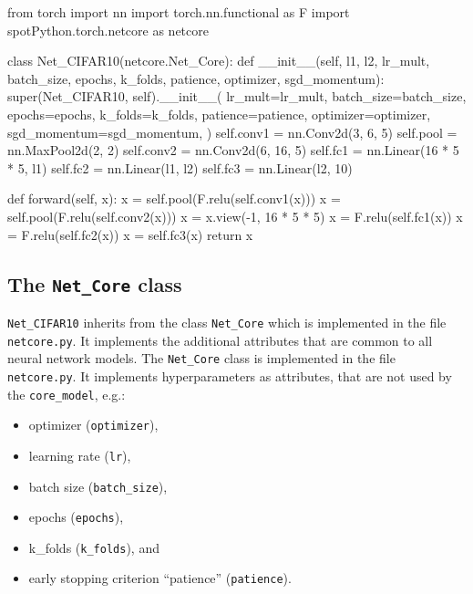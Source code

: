 \documentclass[
  letterpaper,
  DIV=11,
  numbers=noendperiod]{scrreprt}
\newenvironment{Shaded}{\begin{snugshade}}{\end{snugshade}}
\newcommand{\NormalTok}[1]{\textcolor[rgb]{0.00,0.23,0.31}{#1}}
\providecommand{\tightlist}{%
  \setlength{\itemsep}{0pt}\setlength{\parskip}{0pt}}\usepackage{longtable,booktabs,array}
\begin{document}
\begin{Shaded}
\begin{Highlighting}[]
\NormalTok{from torch import nn}
\NormalTok{import torch.nn.functional as F}
\NormalTok{import spotPython.torch.netcore as netcore}


\NormalTok{class Net\_CIFAR10(netcore.Net\_Core):}
\NormalTok{    def \_\_init\_\_(self, l1, l2, lr\_mult, batch\_size, epochs, k\_folds, patience,}
\NormalTok{    optimizer, sgd\_momentum):}
\NormalTok{        super(Net\_CIFAR10, self).\_\_init\_\_(}
\NormalTok{            lr\_mult=lr\_mult,}
\NormalTok{            batch\_size=batch\_size,}
\NormalTok{            epochs=epochs,}
\NormalTok{            k\_folds=k\_folds,}
\NormalTok{            patience=patience,}
\NormalTok{            optimizer=optimizer,}
\NormalTok{            sgd\_momentum=sgd\_momentum,}
\NormalTok{        )}
\NormalTok{        self.conv1 = nn.Conv2d(3, 6, 5)}
\NormalTok{        self.pool = nn.MaxPool2d(2, 2)}
\NormalTok{        self.conv2 = nn.Conv2d(6, 16, 5)}
\NormalTok{        self.fc1 = nn.Linear(16 * 5 * 5, l1)}
\NormalTok{        self.fc2 = nn.Linear(l1, l2)}
\NormalTok{        self.fc3 = nn.Linear(l2, 10)}

\NormalTok{    def forward(self, x):}
\NormalTok{        x = self.pool(F.relu(self.conv1(x)))}
\NormalTok{        x = self.pool(F.relu(self.conv2(x)))}
\NormalTok{        x = x.view({-}1, 16 * 5 * 5)}
\NormalTok{        x = F.relu(self.fc1(x))}
\NormalTok{        x = F.relu(self.fc2(x))}
\NormalTok{        x = self.fc3(x)}
\NormalTok{        return x}
\end{Highlighting}
\end{Shaded}

\hypertarget{sec-the-netcore-class-14}{%
\subsection{\texorpdfstring{The \texttt{Net\_Core}
class}{The Net\_Core class}}\label{sec-the-netcore-class-14}}

\texttt{Net\_CIFAR10} inherits from the class \texttt{Net\_Core} which
is implemented in the file \texttt{netcore.py}. It implements the
additional attributes that are common to all neural network models. The
\texttt{Net\_Core} class is implemented in the file \texttt{netcore.py}.
It implements hyperparameters as attributes, that are not used by the
\texttt{core\_model}, e.g.:

\begin{itemize}
\tightlist
\item
  optimizer (\texttt{optimizer}),
\item
  learning rate (\texttt{lr}),
\item
  batch size (\texttt{batch\_size}),
\item
  epochs (\texttt{epochs}),
\item
  k\_folds (\texttt{k\_folds}), and
\item
  early stopping criterion ``patience'' (\texttt{patience}).
\end{itemize}
\end{document}
